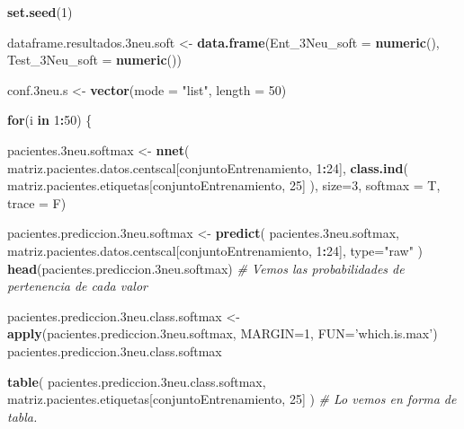 \documentclass[]{article}
\newenvironment{Shaded}{\begin{snugshade}}{\end{snugshade}}
\newcommand{\CommentTok}[1]{\textcolor[rgb]{0.56,0.35,0.01}{\textit{#1}}}
\newcommand{\ControlFlowTok}[1]{\textcolor[rgb]{0.13,0.29,0.53}{\textbf{#1}}}
\newcommand{\DataTypeTok}[1]{\textcolor[rgb]{0.13,0.29,0.53}{#1}}
\newcommand{\DecValTok}[1]{\textcolor[rgb]{0.00,0.00,0.81}{#1}}
\newcommand{\FloatTok}[1]{\textcolor[rgb]{0.00,0.00,0.81}{#1}}
\newcommand{\KeywordTok}[1]{\textcolor[rgb]{0.13,0.29,0.53}{\textbf{#1}}}
\newcommand{\NormalTok}[1]{#1}
\newcommand{\OperatorTok}[1]{\textcolor[rgb]{0.81,0.36,0.00}{\textbf{#1}}}
\newcommand{\StringTok}[1]{\textcolor[rgb]{0.31,0.60,0.02}{#1}}
\begin{document}
\begin{Shaded}
\begin{Highlighting}[]
\KeywordTok{set.seed}\NormalTok{(}\DecValTok{1}\NormalTok{)}

\NormalTok{dataframe.resultados}\FloatTok{.3}\NormalTok{neu.soft <-}\StringTok{ }\KeywordTok{data.frame}\NormalTok{(}\DataTypeTok{Ent_3Neu_soft =} \KeywordTok{numeric}\NormalTok{(),}
                                             \DataTypeTok{Test_3Neu_soft =} \KeywordTok{numeric}\NormalTok{())}

\NormalTok{conf}\FloatTok{.3}\NormalTok{neu.s <-}\StringTok{ }\KeywordTok{vector}\NormalTok{(}\DataTypeTok{mode =} \StringTok{"list"}\NormalTok{, }\DataTypeTok{length =} \DecValTok{50}\NormalTok{)}

\ControlFlowTok{for}\NormalTok{(i }\ControlFlowTok{in} \DecValTok{1}\OperatorTok{:}\DecValTok{50}\NormalTok{)}
\NormalTok{\{}

\NormalTok{  pacientes}\FloatTok{.3}\NormalTok{neu.softmax <-}\StringTok{ }\KeywordTok{nnet}\NormalTok{( matriz.pacientes.datos.centscal[conjuntoEntrenamiento, }\DecValTok{1}\OperatorTok{:}\DecValTok{24}\NormalTok{],}
                                  \KeywordTok{class.ind}\NormalTok{( matriz.pacientes.etiquetas[conjuntoEntrenamiento, }\DecValTok{25}\NormalTok{] ),}
                                  \DataTypeTok{size=}\DecValTok{3}\NormalTok{, }
                                  \DataTypeTok{softmax =}\NormalTok{ T, }
                                  \DataTypeTok{trace =}\NormalTok{ F)}
  
\NormalTok{  pacientes.prediccion}\FloatTok{.3}\NormalTok{neu.softmax <-}\StringTok{ }\KeywordTok{predict}\NormalTok{( pacientes}\FloatTok{.3}\NormalTok{neu.softmax, matriz.pacientes.datos.centscal[conjuntoEntrenamiento, }\DecValTok{1}\OperatorTok{:}\DecValTok{24}\NormalTok{], }\DataTypeTok{type=}\StringTok{"raw"}\NormalTok{ )}
  \KeywordTok{head}\NormalTok{(pacientes.prediccion}\FloatTok{.3}\NormalTok{neu.softmax) }\CommentTok{# Vemos las probabilidades de pertenencia de cada valor}
  
  
\NormalTok{  pacientes.prediccion}\FloatTok{.3}\NormalTok{neu.class.softmax <-}\StringTok{ }\KeywordTok{apply}\NormalTok{(pacientes.prediccion}\FloatTok{.3}\NormalTok{neu.softmax, }\DataTypeTok{MARGIN=}\DecValTok{1}\NormalTok{, }\DataTypeTok{FUN=}\StringTok{'which.is.max'}\NormalTok{)}
\NormalTok{  pacientes.prediccion}\FloatTok{.3}\NormalTok{neu.class.softmax}
  
  
  \KeywordTok{table}\NormalTok{( pacientes.prediccion}\FloatTok{.3}\NormalTok{neu.class.softmax, matriz.pacientes.etiquetas[conjuntoEntrenamiento, }\DecValTok{25}\NormalTok{] )  }\CommentTok{# Lo vemos en forma de tabla.}
  

\end{Highlighting}
\end{Shaded}
\end{document}

